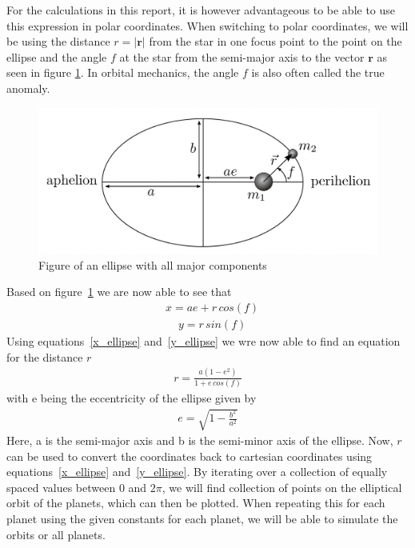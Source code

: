 \documentclass[reprint,english,notitlepage]{revtex4-2}
\begin{document}
For the calculations in this report, it is however advantageous to be able to use this expression in polar coordinates.
When switching to polar coordinates, we will be using the distance $r = |\textbf{r}|$ from the star in one focus point to the point on the ellipse and the angle $f$ at the star from the semi-major axis to the vector $\textbf{r}$ as seen in figure \ref{fig:Ellipse_fig}.
In orbital mechanics, the angle $f$ is also often called the true anomaly.
\begin{figure}[h]
	\centering
	\includegraphics[scale=0.3]{Figures/Ellipse}
	\caption{Figure of an ellipse with all major components}\label{fig:Ellipse_fig}
\end{figure}
Based on figure~\ref{fig:Ellipse_fig} we are now able to see that
\begin{align}
    &x = ae + r\,cos(f) \label{x_ellipse}
\end{align}
\begin{align}
	&y = r\,sin(f) \label{y_ellipse}
\end{align}
Using equations~\ref{x_ellipse} and~\ref{y_ellipse} we wre now able to find an equation for the distance $r$
\begin{align*}
    r = \frac{a(1-e^2)}{1 + e\,cos(f)}
\end{align*}
with e being the eccentricity of the ellipse given by
\begin{align*}
    e = \sqrt{1-\frac{b^2}{a^2}}
\end{align*}
Here, a is the semi-major axis and b is the semi-minor axis of the ellipse.
Now, $r$ can be used to convert the coordinates back to cartesian coordinates using equations~\ref{x_ellipse} and~\ref{y_ellipse}.
By iterating over a collection of equally spaced values between $0$ and $2\pi$, we will find collection of points on the elliptical orbit of the planets, which can then be plotted.
When repeating this for each planet using the given constants for each planet, we will be able to simulate the orbits or all planets.\\\\
\end{document}
